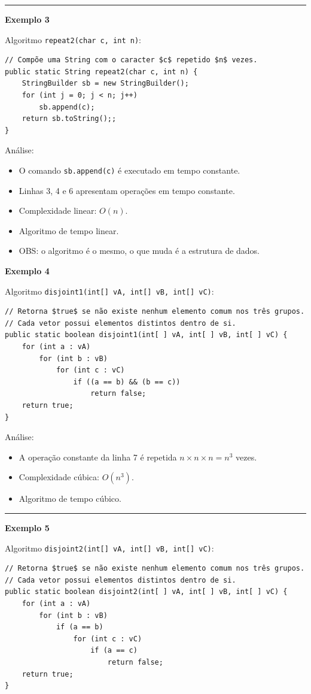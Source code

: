 \rule{\textwidth}{1pt}

\textbf{Exemplo 3}

Algoritmo \texttt{repeat2(char c, int n)}:
\begin{verbatim}
// Compõe uma String com o caracter $c$ repetido $n$ vezes.
public static String repeat2(char c, int n) {
	StringBuilder sb = new StringBuilder();
	for (int j = 0; j < n; j++)
		sb.append(c);
	return sb.toString();;
}
\end{verbatim}

Análise:
\begin{itemize}
	\item O comando \texttt{sb.append(c)} é executado em tempo constante.
	\item Linhas 3, 4 e 6 apresentam operações em tempo constante.
	\item Complexidade linear: $O(n)$.
	\item Algoritmo de tempo linear.
	\item OBS: o algoritmo é o mesmo, o que muda é a estrutura de dados.
\end{itemize}

\clearpage

\textbf{Exemplo 4}

Algoritmo \texttt{disjoint1(int[] vA, int[] vB, int[] vC)}:
\begin{verbatim}
// Retorna $true$ se não existe nenhum elemento comum nos três grupos.
// Cada vetor possui elementos distintos dentro de si.
public static boolean disjoint1(int[ ] vA, int[ ] vB, int[ ] vC) {
	for (int a : vA)
		for (int b : vB)
			for (int c : vC)
				if ((a == b) && (b == c))
					return false;
	return true;
}
\end{verbatim}

Análise:
\begin{itemize}
	\item A operação constante da linha 7 é repetida $n \times n \times n = n^3$ vezes.
	\item Complexidade cúbica: $O(n^3)$.
	\item Algoritmo de tempo cúbico.
\end{itemize}

\medskip

\rule{\textwidth}{1pt}

\textbf{Exemplo 5}

Algoritmo \texttt{disjoint2(int[] vA, int[] vB, int[] vC)}:
\begin{verbatim}
// Retorna $true$ se não existe nenhum elemento comum nos três grupos.
// Cada vetor possui elementos distintos dentro de si.
public static boolean disjoint2(int[ ] vA, int[ ] vB, int[ ] vC) {
	for (int a : vA)
		for (int b : vB)
			if (a == b)
				for (int c : vC)
					if (a == c)
						return false;
	return true;
}
\end{verbatim}

